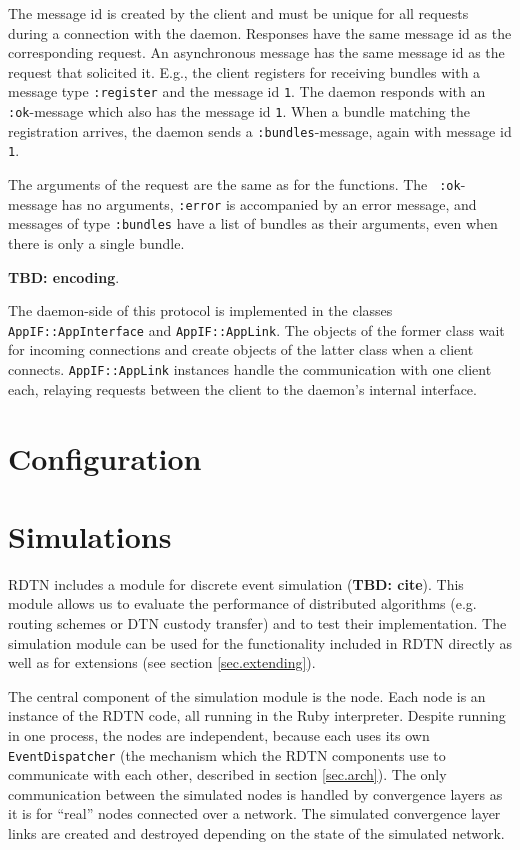\documentclass{article}
\begin{document}
The message id is created by the client and must be unique for all requests
during a connection with the daemon. Responses have the same message id as the
corresponding request. An asynchronous message has the same message id as the
request that solicited it. E.g., the client registers for receiving bundles with
a message type {\tt :register} and the message id {\tt 1}. The daemon responds
with an {\tt :ok}-message which also has the message id {\tt 1}. When a bundle
matching the registration arrives, the daemon sends a {\tt :bundles}-message,
again with message id {\tt 1}.

The arguments of the request are the same as for the functions. The {\tt
:ok}-message has no arguments, {\tt :error} is accompanied by an error message,
and messages of type {\tt :bundles} have a list of bundles as their arguments,
even when there is only a single bundle.

{\bf TBD: encoding}.

The daemon-side of this protocol is implemented in the classes {\tt
AppIF::AppInterface} and {\tt AppIF::AppLink}. The objects of the former class
wait for incoming connections and create objects of the latter class when a
client connects. {\tt AppIF::AppLink} instances handle the communication with
one client each, relaying requests between the client to the daemon's internal
interface.

\section{Configuration}\label{sec.config}

\section{Simulations}\label{sec.sim}

RDTN includes a module for discrete event simulation ({\bf TBD: cite}). This
module allows us to evaluate the performance of distributed algorithms (e.g.
routing schemes or DTN custody transfer) and to test their implementation. The
simulation module can be used for the functionality included in RDTN
directly as well as for extensions (see section \ref{sec.extending}).

The central component of the simulation module is the node. Each node is an
instance of the RDTN code, all running in the Ruby interpreter. Despite running
in one process, the nodes are independent, because each uses its own {\tt
EventDispatcher} (the mechanism which the RDTN components use to communicate
with each other, described in section \ref{sec.arch}). The only communication
between the simulated nodes is handled by convergence layers as it is for
``real'' nodes connected over a network. The simulated convergence layer links
are created and destroyed depending on the state of the simulated network.
\end{document}
